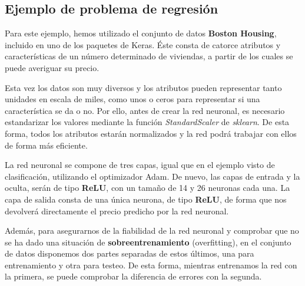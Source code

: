 \subsection{Ejemplo de problema de regresión}
Para este ejemplo, hemos utilizado el conjunto de datos \textbf{Boston Housing}, incluido en uno de los paquetes de Keras. Éste consta de catorce atributos y características de un número determinado de viviendas, a partir de los cuales se puede averiguar su precio. 

Esta vez los datos son muy diversos y los atributos pueden representar tanto unidades en escala de miles, como unos o ceros para representar si una característica se da o no. Por ello, antes de crear la red neuronal, es necesario estandarizar los valores mediante la función \textit{StandardScaler} de \textit{sklearn}. De esta forma, todos los atributos estarán normalizados y la red podrá trabajar con ellos de forma más eficiente.

La red neuronal se compone de tres capas, igual que en el ejemplo visto de clasificación, utilizando el optimizador Adam. De nuevo, las capas de entrada y la oculta, serán de tipo \textbf{ReLU}, con un tamaño de 14 y 26 neuronas cada una. La capa de salida consta de una única neurona, de tipo \textbf{ReLU}, de forma que nos devolverá directamente el precio predicho por la red neuronal. 

Además, para asegurarnos de la fiabilidad de la red neuronal y comprobar que no se ha dado una situación de \textbf{sobreentrenamiento} (overfitting), en el conjunto de datos disponemos dos partes separadas de estos últimos, una para entrenamiento y otra para testeo. De esta forma, mientras entrenamos la red con la primera, se puede comprobar la diferencia de errores con la segunda. 


